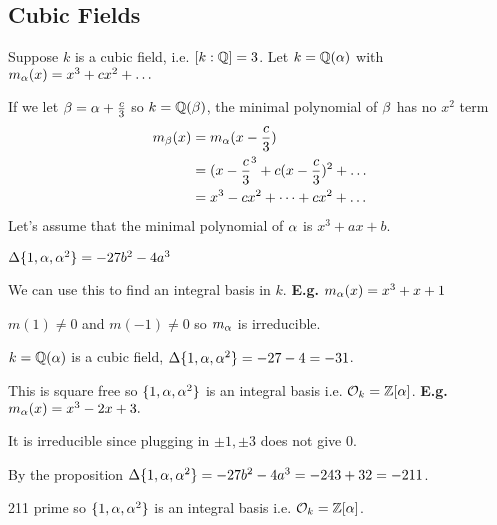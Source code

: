 \documentclass[11pt]{article}
\begin{document}
\subsection{Cubic Fields}
Suppose $k$ is a cubic field, i.e. $[k : \mathbb{Q}] = 3$. 
Let $k = \mathbb{Q} (\alpha) $ with $m_\alpha(x) = x^3 + cx^2 +\dots$

If we let $\beta = \alpha + \frac{c}3$ so $k = \mathbb{Q}(\beta) $, the minimal polynomial of $\beta$ has no $x^2$ term
\begin{align*}
	m_\beta(x) &= m_\alpha(x- \frac{c}{3})\\
	& = (x- \frac{c}{3}^3 + c(x-\frac{c}{3})^2 + \dots\\
	& = x^3 - cx^2 + \dots +cx^2 + \dots 
\end{align*}
Let's assume that the minimal polynomial of $\alpha$ is $x^3 + ax + b$.

\begin{prop}
	$\Delta \{1, \alpha, \alpha^2 \} = -27b^2 - 4a^3$	
\end{prop}
\spa
We can use this to find an integral basis in $k$.
\spac
\textbf{E.g.} $m_\alpha(x) = x^3 + x+ 1$
\spa

$m(1) \neq 0 $ and $m(-1) \neq 0 $ so $m_\alpha$ is irreducible.
\spa

$k = \mathbb{Q}(\alpha)$ is a cubic field, $\Delta \{1, \alpha, \alpha^2 \} = -27-4 = -31$.
\spa

This is square free so $\{ 1, \alpha, \alpha^2 \}$ is an integral basis i.e. $\mathcal{O}_k = \mathbb{Z}[\alpha]$.
\spac
\textbf{E.g.} $m_\alpha(x) = x^3 -2x + 3.$ 
\spa

It is irreducible since plugging in $\pm1, \pm 3$ does not give 0.
\spa

By the proposition $\Delta \{ 1, \alpha, \alpha^2 \} = -27b^2 - 4a^3 = -243+32=-211$.
\spa

211 prime so $\{1, \alpha, \alpha^2 \}$ is an integral basis i.e. $\mathcal{O}_k = \mathbb{Z}[\alpha]$.
\end{document}
